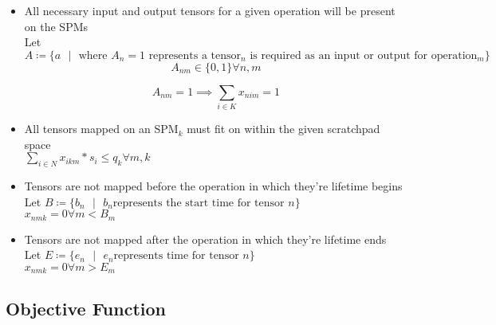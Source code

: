 \documentclass{article}
\begin{document}
\begin{itemize}
	\item All necessary input and output tensors for a given operation will be present on the SPMs\\

		Let $A \coloneqq \{ a \text{ } | \text{ } \text{where } A_n = 1\text{ represents a tensor$_n$ is required as an input or output for operation$_m$} \}$\\
		\[
			A_{nm} \in \{0, 1\} \forall n,m
		\]

		\[
			A_{nm} = 1 \implies \sum_{i \in K} x_{nim} = 1 
		\]

	\item All tensors mapped on an SPM$_k$ must fit on within the given scratchpad space\\

		$\sum_{i \in N} {x_{ikm} * s_i} \leq q_k \forall m,k$\\

	\item Tensors are not mapped before the operation in which they're lifetime begins \\

		Let $B \coloneqq \{ b_n \text{ } | \text{ }  b_n \text{represents the start time for tensor $n$}\}$ \\

		$x_{nmk} = 0 \forall m < B_m$

	\item Tensors are not mapped after the operation in which they're lifetime ends \\

		Let $E \coloneqq \{ e_n \text{ } | \text{ }  e_n \text{represents time for tensor $n$}\}$ \\

		$x_{nmk} = 0 \forall m > E_m$
\end{itemize}


\subsection{Objective Function}
\end{document}
